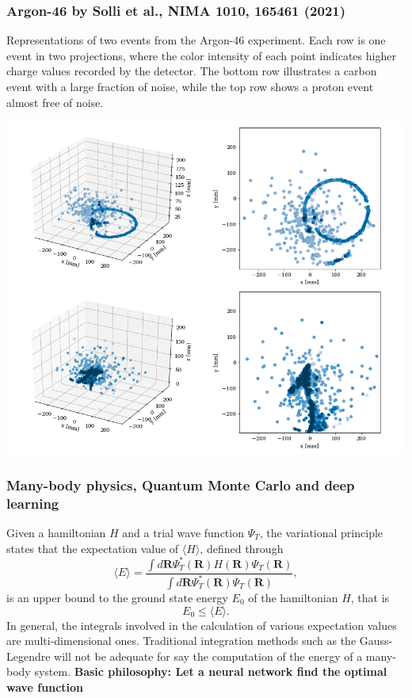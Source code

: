 \documentclass{beamer}
\begin{document}
\begin{frame}
\frametitle{Argon-46 by Solli et al., NIMA 1010, 165461 (2021)}

\begin{block}{}
Representations of two events from the
Argon-46 experiment. Each row is one event in two projections,
where the color intensity of each point indicates higher charge values
recorded by the detector. The bottom row illustrates a carbon event with
a large fraction of noise, while the top row shows a proton event
almost free of noise. 
\end{block}

\vspace{6mm}

\centerline{\includegraphics[width=0.6\linewidth]{figures/examples_raw.png}}

\vspace{6mm}
\end{frame}

\begin{frame}
\frametitle{Many-body physics, Quantum Monte Carlo and deep learning}

\begin{block}{}
Given a hamiltonian $H$ and a trial wave function $\Psi_T$, the variational principle states that the expectation value of $\langle H \rangle$, defined through 
\[
   \langle E \rangle =
   \frac{\int d\bm{R}\Psi^{\ast}_T(\bm{R})H(\bm{R})\Psi_T(\bm{R})}
        {\int d\bm{R}\Psi^{\ast}_T(\bm{R})\Psi_T(\bm{R})},
\]
is an upper bound to the ground state energy $E_0$ of the hamiltonian $H$, that is 
\[
    E_0 \le \langle E \rangle.
\]
In general, the integrals involved in the calculation of various  expectation values  are multi-dimensional ones. Traditional integration methods such as the Gauss-Legendre will not be adequate for say the  computation of the energy of a many-body system.  \textbf{Basic philosophy: Let a neural network find the optimal wave function}
\end{block}
\end{frame}
\end{document}
